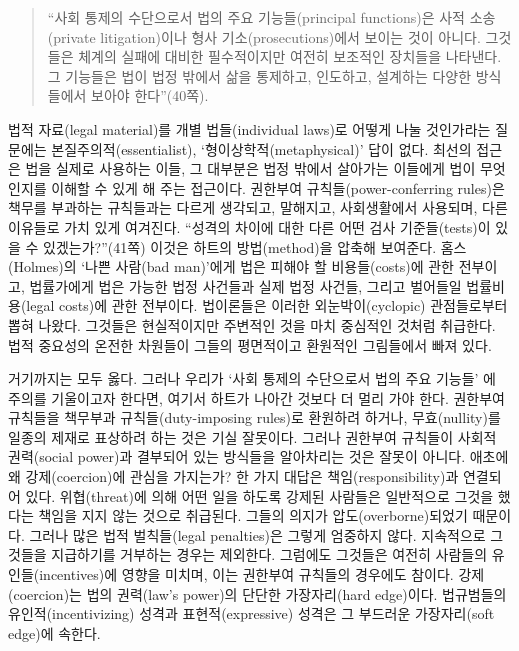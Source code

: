 \begin{quote}
“사회 통제의 수단으로서 법의 주요 기능들(principal functions)은 사적
소송(private litigation)이나 형사 기소(prosecutions)에서 보이는 것이
아니다. 그것들은 체계의 실패에 대비한 필수적이지만 여전히 보조적인
장치들을 나타낸다. 그 기능들은 법이 법정 밖에서 삶을 통제하고, 인도하고,
설계하는 다양한 방식들에서 보아야 한다”(40쪽).
\end{quote}

법적 자료(legal material)를 개별 법들(individual laws)로 어떻게 나눌
것인가라는 질문에는 본질주의적(essentialist), ‘형이상학적(metaphysical)’
답이 없다. 최선의 접근은 법을 실제로 사용하는 이들, 그 대부분은 법정
밖에서 살아가는 이들에게 법이 무엇인지를 이해할 수 있게 해 주는
접근이다. 권한부여 규칙들(power-conferring rules)은 책무를 부과하는
규칙들과는 다르게 생각되고, 말해지고, 사회생활에서 사용되며, 다른
이유들로 가치 있게 여겨진다. “성격의 차이에 대한 다른 어떤 검사
기준들(tests)이 있을 수 있겠는가?”(41쪽) 이것은 하트의 방법(method)을
압축해 보여준다. 홈스(Holmes)의 ‘나쁜 사람(bad man)’에게 법은 피해야 할
비용들(costs)에 관한 전부이고, 법률가에게 법은 가능한 법정 사건들과 실제
법정 사건들, 그리고 벌어들일 법률비용(legal costs)에 관한 전부이다.
법이론들은 이러한 외눈박이(cyclopic) 관점들로부터 뽑혀 나왔다. 그것들은
현실적이지만 주변적인 것을 마치 중심적인 것처럼 취급한다. 법적 중요성의
온전한 차원들이 그들의 평면적이고 환원적인 그림들에서 빠져 있다.

거기까지는 모두 옳다. 그러나 우리가 ‘사회 통제의 수단으로서 법의 주요
기능들’ 에 주의를 기울이고자 한다면, 여기서 하트가 나아간
것보다 더 멀리 가야 한다. 권한부여 규칙들을 책무부과
규칙들(duty-imposing rules)로 환원하려 하거나, 무효(nullity)를 일종의
제재로 표상하려 하는 것은 기실 잘못이다. 그러나 권한부여 규칙들이 사회적
권력(social power)과 결부되어 있는 방식들을 알아차리는 것은 잘못이
아니다. 애초에 왜 강제(coercion)에 관심을 가지는가? 한 가지 대답은
책임(responsibility)과 연결되어 있다. 위협(threat)에 의해 어떤 일을
하도록 강제된 사람들은 일반적으로 그것을 했다는 책임을 지지 않는 것으로
취급된다. 그들의 의지가 압도(overborne)되었기 때문이다. 그러나 많은 법적
벌칙들(legal penalties)은 그렇게 엄중하지 않다. 지속적으로 그것들을
지급하기를 거부하는 경우는 제외한다. 그럼에도 그것들은 여전히 사람들의
유인들(incentives)에 영향을 미치며, 이는 권한부여 규칙들의 경우에도
참이다. 강제(coercion)는 법의 권력(law's power)의 단단한 가장자리(hard
edge)이다. 법규범들의 유인적(incentivizing) 성격과 표현적(expressive)
성격은 그 부드러운 가장자리(soft edge)에 속한다.

